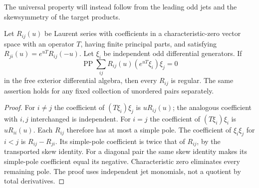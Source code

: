 The universal property will instead follow from the leading odd jets
and the skewsymmetry of the target products.

\begin{lemma}\label{w4d:lem:odd-detection}
Let $R_{ij}(u)$ be Laurent series with coefficients in a characteristic-zero vector space with an operator $T$, having finite principal parts, and satisfying
$R_{ji}(u)=e^{uT}R_{ij}(-u)$. Let $\xi_i$ be independent odd differential generators. If
\[
 \operatorname{PP}\sum_{ij}R_{ij}(u)(e^{uT}\xi_i)\xi_j=0
\]
in the free exterior differential algebra, then every $R_{ij}$ is regular. The same assertion holds for any fixed collection of unordered pairs separately.
\end{lemma}
\begin{proof}
For $i\ne j$ the coefficient of $(T\xi_i)\xi_j$ is $uR_{ij}(u)$; the analogous coefficient with $i,j$ interchanged is independent. For $i=j$ the coefficient of $(T\xi_i)\xi_i$ is $uR_{ii}(u)$. Each $R_{ij}$ therefore has at most a simple pole. The coefficient of $\xi_i\xi_j$ for $i<j$ is $R_{ij}-R_{ji}$. Its simple-pole coefficient is twice that of $R_{ij}$, by the transported skew identity. For a diagonal pair the same skew identity makes its simple-pole coefficient equal its negative. Characteristic zero eliminates every remaining pole. The proof uses independent jet monomials, not a quotient by total derivatives.
\end{proof}

